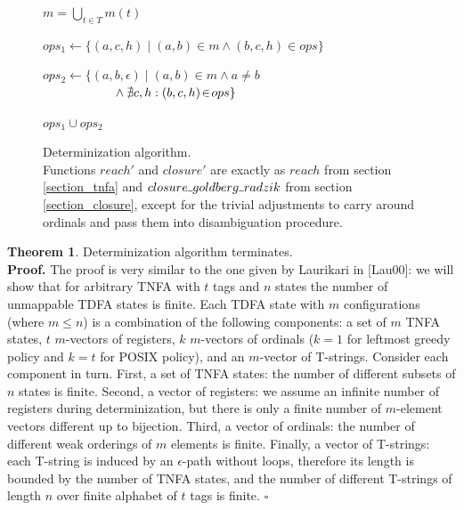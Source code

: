\documentclass{article}
\newcommand{\Xset}{\!\leftarrow\!}
\newcommand{\Xund}{\rule{.4em}{.4pt}} %
\newcommand{\Xin}{\!\in\!}
\newcommand{\Xeq}{\!=\!}
\theoremstyle{definition}
\newtheorem{XThe}{Theorem}
\begin{document}
\begin{multicols}{2}
\begin{figure}
\begin{multicols}{2}
\begin{algorithm}[H]
{{            \Let $m \Xeq \bigcup_{t \in T} m(t)$ \;

            $ops_1 \Xset \{ (a, c, h) \mid (a, b) \Xin m \wedge (b, c, h) \Xin ops \}$ \;

            $ops_2 \Xset \{ (a, b, \epsilon) \mid (a, b) \Xin m \wedge a \!\neq\! b$
                $\hphantom{hspace{1.5em}} \wedge \nexists c, h: (b, c, h) \Xin ops \}$ \;

            \Return $ops_1 \cup ops_2$ \;
        } \lElse {
            \Return \Und
        }
    }
    \end{algorithm}

\end{multicols}
\begin{center}
\caption{Determinization algorithm.\\
Functions $reach'$ and $closure'$ are exactly as
$reach$ from section \ref{section_tnfa} and $closure \Xund goldberg \Xund radzik$ from section \ref{section_closure},
except for the trivial adjustments to carry around ordinals and pass them into disambiguation procedure.
}
\end{center}
\end{figure}

\begin{XThe}
Determinization algorithm terminates.
\\[0.5em]
\textbf{Proof.}
The proof is very similar to the one given by Laurikari in [Lau00]:
we will show that for arbitrary TNFA with $t$ tags and $n$ states the number of unmappable TDFA states is finite.
Each TDFA state with $m$ configurations (where $m \!\leq\! n$) is a combination of the following components:
a set of $m$ TNFA states,
$t$ $m$-vectors of registers,
$k$ $m$-vectors of ordinals ($k \Xeq 1$ for leftmost greedy policy and $k \Xeq t$ for POSIX policy),
and an $m$-vector of T-strings.
Consider each component in turn.
First, a set of TNFA states: the number of different subsets of $n$ states is finite.
Second, a vector of registers: we assume an infinite number of registers during determinization,
but there is only a finite number of $m$-element vectors different up to bijection.
Third, a vector of ordinals: the number of different weak orderings of $m$ elements is finite.
Finally, a vector of T-strings: each T-string is induced by an $\epsilon$-path without loops,
therefore its length is bounded by the number of TNFA states,
and the number of different T-strings of length $n$ over finite alphabet of $t$ tags is finite.
$\square$
\end{XThe}


\end{multicols}
\end{document}
